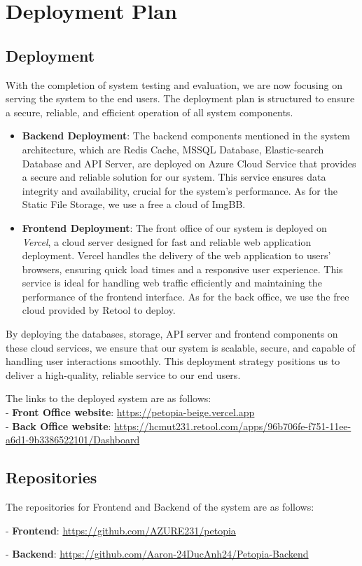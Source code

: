 \chapter{Deployment Plan}

\section{Deployment}

With the completion of system testing and evaluation, we are now focusing on serving the system to the end users. The deployment plan is structured to ensure a secure, reliable, and efficient operation of all system components.

\begin{itemize}
    \item \textbf{Backend Deployment}: The backend components mentioned in the system architecture,
    which are Redis Cache, MSSQL Database, Elastic-search Database and API Server,
    are deployed on Azure Cloud Service that provides a secure and 
    reliable solution for our system. This service ensures data integrity and availability, crucial for the system’s performance.
    As for the Static File Storage, we use a free a cloud of ImgBB.
    \item \textbf{Frontend Deployment}: The front office of our system is deployed on \textit{Vercel}, a cloud server designed for fast and reliable web application deployment. Vercel handles the delivery of the web application to users' browsers, ensuring quick load times and a responsive user experience. This service is ideal for handling web traffic efficiently and maintaining the performance of the frontend interface.
    As for the back office, we use the free cloud provided by Retool to deploy.
\end{itemize}

By deploying the databases, storage, API server and frontend components on these cloud services, we ensure that our system is scalable, secure, and capable of handling user interactions smoothly. This deployment strategy positions us to deliver a high-quality, reliable service to our end users.

The links to the deployed system are as follows:\\
- \textbf{Front Office website}: \url{https://petopia-beige.vercel.app}\\
- \textbf{Back Office website}: \url{https://hcmut231.retool.com/apps/96b706fe-f751-11ee-a6d1-9b3386522101/Dashboard}
\section{Repositories}

The repositories for Frontend and Backend of the system are as follows:

- \textbf{Frontend}: \url{https://github.com/AZURE231/petopia}

- \textbf{Backend}: \url{https://github.com/Aaron-24DucAnh24/Petopia-Backend}
